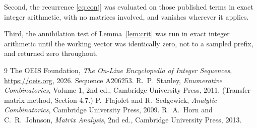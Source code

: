 \documentclass[11pt,a4paper]{article}
\theoremstyle{plain}
\theoremstyle{definition}
\begin{document}
Second, the recurrence \eqref{eq:conj} was evaluated on those published terms in exact
integer arithmetic, with no matrices involved, and vanishes wherever it applies.

Third, the annihilation test of Lemma~\ref{lem:crit} was run in exact integer arithmetic
until the working vector was identically zero, not to a sampled prefix, and returned zero
throughout.

\begin{thebibliography}{9}
 The OEIS Foundation, \emph{The On-Line Encyclopedia of Integer
Sequences}, \url{https://oeis.org}, 2026. Sequence A206253.
 R.~P.~Stanley, \emph{Enumerative Combinatorics}, Volume 1, 2nd ed.,
Cambridge University Press, 2011. (Transfer-matrix method, Section 4.7.)
 P.~Flajolet and R.~Sedgewick, \emph{Analytic Combinatorics}, Cambridge
University Press, 2009.
 R.~A.~Horn and C.~R.~Johnson, \emph{Matrix Analysis}, 2nd ed., Cambridge
University Press, 2013.
\end{thebibliography}
\end{document}
